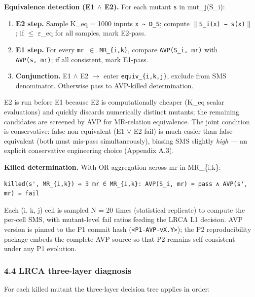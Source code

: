 \documentclass[review,12pt,authoryear]{elsarticle}
\providecommand{\tightlist}{\setlength{\itemsep}{0pt}\setlength{\parskip}{0pt}}
\begin{document}
\textbf{Equivalence detection (E1 $\wedge$ E2).} For each mutant
\texttt{s\textquotesingle{}} in mut\_j(S\_i):

\begin{enumerate}
\def\labelenumi{\arabic{enumi}.}
\tightlist
\item
  \textbf{E2 step.} Sample K\_eq = 1000 inputs
  \texttt{x\ \textasciitilde{}\ D\_S}; compute
  \texttt{$\|$S\_i(x)\ −\ s\textquotesingle{}(x)$\|$}; if $\leq$ $\varepsilon$\_eq for all
  samples, mark E2-pass.
\item
  \textbf{E1 step.} For every \texttt{mr\ $\in$\ MR\_\{i,k\}}, compare
  \texttt{AVP(S\_i,\ mr)} with \texttt{AVP(s\textquotesingle{},\ mr)};
  if all consistent, mark E1-pass.
\item
  \textbf{Conjunction.} E1 $\wedge$ E2 $\to$ enter \texttt{equiv\_\{i,k,j\}},
  exclude from SMS denominator. Otherwise pass to AVP-killed
  determination.
\end{enumerate}

E2 is run before E1 because E2 is computationally cheaper (K\_eq scalar
evaluations) and quickly discards numerically distinct mutants; the
remaining candidates are screened by AVP for MR-relation equivalence.
The joint condition is conservative: false-non-equivalent (E1 $\vee$ E2 fail)
is much easier than false-equivalent (both must mis-pass
simultaneously), biasing SMS slightly \emph{high} --- an explicit
conservative engineering choice (Appendix A.3).

\textbf{Killed determination.} With OR-aggregation across mr in
MR\_\{i,k\}:

\begin{verbatim}
killed(s', MR_{i,k}) ⇔ ∃ mr ∈ MR_{i,k}: AVP(S_i, mr) = pass ∧ AVP(s', mr) = fail
\end{verbatim}

Each (i, k, j) cell is sampled N = 20 times (statistical replicate) to
compute the per-cell SMS, with mutant-level fail ratios feeding the LRCA
L1 decision. AVP version is pinned to the P1 commit hash
(\texttt{\textless{}P1-AVP-vX.Y\textgreater{}}); the P2 reproducibility
package embeds the complete AVP source so that P2 remains
self-consistent under any P1 evolution.

\subsubsection{4.4 LRCA three-layer
diagnosis}\label{lrca-three-layer-diagnosis}

For each killed mutant the three-layer decision tree applies in order:
\end{document}
